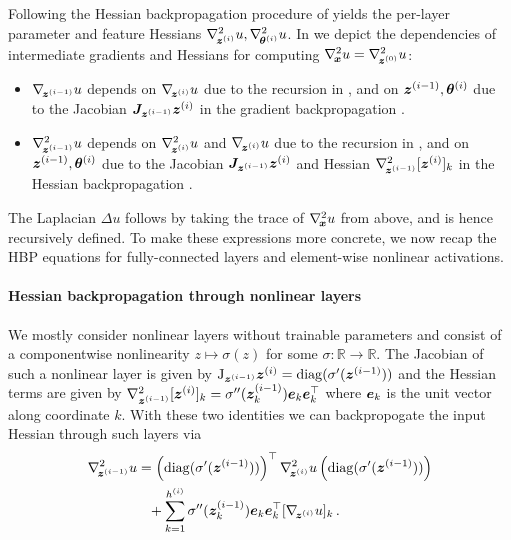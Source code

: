 Following the Hessian backpropagation procedure of  yields the
per-layer parameter and feature Hessians $\nabla_{\!{{\bm{z}}^{(i)}}}^{2}u,
\nabla_{\!{{\bm{\theta}}^{(i)}}}^{2}u$. In  we depict the dependencies of
intermediate gradients and Hessians for computing $\nabla_{\!{{\bm{x}}}}^{2}u = \nabla_{\!{{\bm{z}}^{(0)}}}^{2}u$:
\begin{itemize}
\item $\nabla_{\!{{\bm{z}}^{(i-1)}}}u$ depends on $\nabla_{\!{{\bm{z}}^{(i)}}}u$ due to the recursion in , and on ${\bm{z}}^{(i-1)}, {\bm{\theta}}^{(i)}$ due to the Jacobian ${\bm{J}}_{{\bm{z}}^{(i-1)}}{\bm{z}}^{(i)}$ in the gradient backpropagation .

\item $\nabla_{\!{{\bm{z}}^{(i-1)}}}^{2}u$ depends on $\nabla_{\!{{\bm{z}}^{(i)}}}^{2}u$ and $\nabla_{\!{{\bm{z}}^{(i)}}} u$ due to the recursion in , and on ${\bm{z}}^{(i-1)}, {\bm{\theta}}^{(i)}$ due to the Jacobian ${\bm{J}}_{{\bm{z}}^{(i-1)}}{\bm{z}}^{(i)}$ and Hessian $\nabla_{\!{{\bm{z}}^{(i-1)}}}^{2}[{\bm{z}}^{(i)}]_k$ in the Hessian backpropagation .
\end{itemize}

The Laplacian $\Delta u$ follows by taking the trace of
$\nabla_{\!{{\bm{x}}}}^{2}u$ from above, and is hence recursively defined.
To make these expressions more concrete, we now recap the HBP equations for fully-connected layers and element-wise nonlinear activations.


\paragraph{Hessian backpropagation through nonlinear layers}
We mostly consider nonlinear layers without trainable parameters and consist of a componentwise nonlinearity $z\mapsto \sigma(z)$ for some $\sigma\colon\mathbb R\to\mathbb R$.
The Jacobian of such a nonlinear layer is given by $\mathrm{J}_{{\bm{z}}^{(i-1)}}{\bm{z}}^{(i)} = \operatorname{diag}(\sigma'({\bm{z}}^{(i-1)}))$ and the Hessian terms are given by $\nabla^2_{{\bm{z}}^{(i-1)}}[{\bm{z}}^{(i)}]_k = \sigma''({\bm{z}}^{(i-1)}_k) {\bm{e}}_k {\bm{e}}_k^\top$ where ${\bm{e}}_k$ is the unit vector along coordinate $k$.
With these two identities we can backpropogate the input Hessian through such layers via
\begin{align}
  \begin{split}
    \nabla_{\!{{\bm{z}}^{(i-1)}}}^{2}u
    &=
      \left( \operatorname{diag}(\sigma'({\bm{z}}^{(i-1)})) \right)^{\top}
      \nabla_{\!{{\bm{z}}^{(i)}}}^{2}u
      \left( \operatorname{diag}(\sigma'({\bm{z}}^{(i-1)})) \right)
    \\
    &\phantom{=}+
      \sum_{k=1}^{h^{(i)}}
      \sigma''({\bm{z}}^{(i-1)}_k)
      {\bm{e}}_k {\bm{e}}_k^\top
      [\nabla_{\!{{\bm{z}}^{(i)}}} u]_k\,.
  \end{split}
\end{align}

